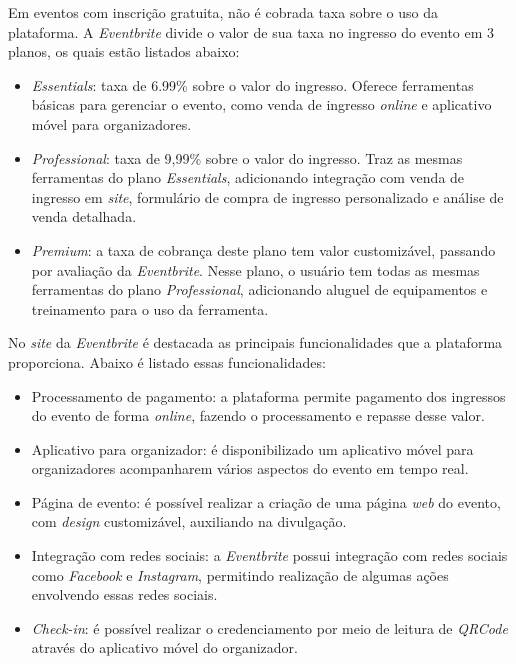 Em eventos com inscrição gratuita, não é cobrada taxa sobre o uso da plataforma. A \textit{Eventbrite} divide o valor de sua taxa no ingresso do evento em 3 planos, os quais estão listados abaixo:

\begin{itemize}
    \item \textit{Essentials}: taxa de 6.99\% sobre o valor do ingresso. Oferece ferramentas básicas para gerenciar o evento, como venda de ingresso \textit{online} e aplicativo móvel para organizadores.
    \item \textit{Professional}: taxa de 9,99\% sobre o valor do ingresso. Traz as mesmas ferramentas do plano \textit{Essentials}, adicionando integração com venda de ingresso em \textit{site}, formulário de compra de ingresso personalizado e análise de venda detalhada.
    \item \textit{Premium}: a taxa de cobrança deste plano tem valor customizável, passando por avaliação da \textit{Eventbrite}. Nesse plano, o usuário tem todas as mesmas ferramentas do plano \textit{Professional}, adicionando aluguel de equipamentos e treinamento para o uso da ferramenta.
\end{itemize}

No \textit{site} da \textit{Eventbrite} é destacada as principais funcionalidades que a plataforma proporciona. Abaixo é listado essas funcionalidades:

\begin{itemize}
    \item Processamento de pagamento: a plataforma permite pagamento dos ingressos do evento de forma \textit{online}, fazendo o processamento e repasse desse valor.
    \item Aplicativo para organizador: é disponibilizado um aplicativo móvel para organizadores acompanharem vários aspectos do evento em tempo real.
    \item Página de evento: é possível realizar a criação de uma página \textit{web} do evento, com \textit{design} customizável, auxiliando na divulgação.
    \item Integração com redes sociais: a \textit{Eventbrite} possui integração com redes sociais como \textit{Facebook} e \textit{Instagram}, permitindo realização de algumas ações envolvendo essas redes sociais.
    \item \textit{Check-in}: é possível realizar o credenciamento por meio de leitura de \textit{QRCode} através do aplicativo móvel do organizador.
\end{itemize}

